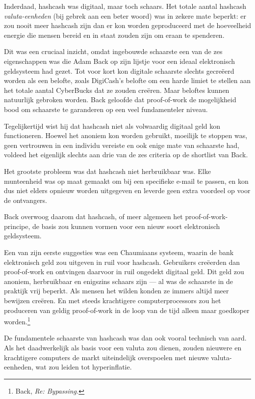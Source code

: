 \documentclass[
  a5paper,
  smalldemyvopaper,11pt,twoside,onecolumn,openright,extrafontsizes,
hidelinks]{memoir}
\begin{document}
Inderdaad, hashcash was digitaal, maar toch schaars. Het totale aantal
hashcash \emph{valuta-eenheden} (bij gebrek aan een beter woord) was in
zekere mate beperkt: er zou nooit meer hashcash zijn dan er kon worden
geproduceerd met de hoeveelheid energie die mensen bereid en in staat
zouden zijn om eraan te spenderen.

Dit was een cruciaal inzicht, omdat ingebouwde schaarste een van de zes
eigenschappen was die Adam Back op zijn lijstje voor een ideaal
elektronisch geldsysteem had gezet. Tot voor kort kon digitale schaarste
slechts gecreëerd worden als een belofte, zoals DigiCash's belofte om
een harde limiet te stellen aan het totale aantal CyberBucks dat ze
zouden creëren. Maar beloftes kunnen natuurlijk gebroken worden. Back
geloofde dat proof-of-work de mogelijkheid bood om schaarste te
garanderen op een veel fundamenteler niveau.

Tegelijkertijd wist hij dat hashcash niet als volwaardig digitaal geld
kon functioneren. Hoewel het anoniem kon worden gebruikt, moeilijk te
stoppen was, geen vertrouwen in een individu vereiste en ook enige mate
van schaarste had, voldeed het eigenlijk slechts aan drie van de zes
criteria op de shortlist van Back.

Het grootste probleem was dat hashcash niet herbruikbaar was. Elke
munteenheid was op maat gemaakt om bij een specifieke e-mail te passen,
en kon dus niet elders opnieuw worden uitgegeven en leverde geen extra
voordeel op voor de ontvangers.

Back overwoog daarom dat hashcash, of meer algemeen het
proof-of-work-principe, de basis zou kunnen vormen voor een nieuw soort
elektronisch geldsysteem.

Een van zijn eerste suggesties was een Chaumiaans systeem, waarin de
bank elektronisch geld zou uitgeven in ruil voor hashcash. Gebruikers
creëerden dan proof-of-work en ontvingen daarvoor in ruil ongedekt
digitaal geld. Dit geld zou anoniem, herbruikbaar en enigszins schaars
zijn --- al was de schaarste in de praktijk vrij beperkt. Als mensen het
wilden konden ze immers altijd meer bewijzen creëren. En met steeds
krachtigere computerprocessors zou het produceren van geldig
proof-of-work in de loop van de tijd alleen maar goedkoper
worden.\footnote{Back, \emph{Re: Bypassing.}}

De fundamentele schaarste van hashcash was dan ook vooral technisch van
aard. Als het daadwerkelijk als basis voor een valuta zou dienen, zouden
nieuwere en krachtigere computers de markt uiteindelijk overspoelen met
nieuwe valuta-eenheden, wat zou leiden tot hyperinflatie.
\end{document}

